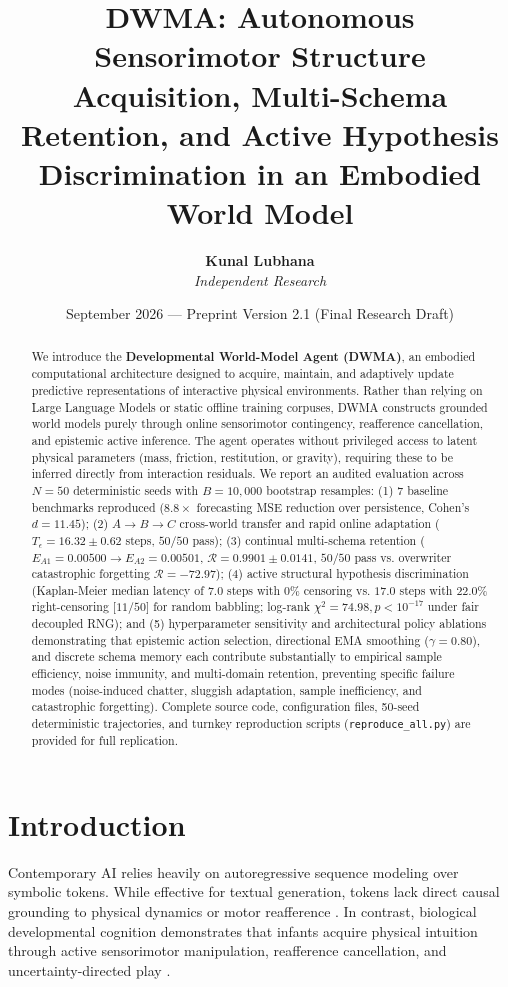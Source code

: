 \documentclass[10pt,twocolumn,a4paper]{article}
\title{\textbf{DWMA: Autonomous Sensorimotor Structure Acquisition, Multi-Schema Retention, and Active Hypothesis Discrimination in an Embodied World Model}}
\author{
  \textbf{Kunal Lubhana} \\
  \textit{Independent Research}
}
\date{September 2026 --- Preprint Version 2.1 (Final Research Draft)}
\begin{document}
\maketitle

\begin{abstract}
We introduce the \textbf{Developmental World-Model Agent (DWMA)}, an embodied computational architecture designed to acquire, maintain, and adaptively update predictive representations of interactive physical environments. Rather than relying on Large Language Models or static offline training corpuses, DWMA constructs grounded world models purely through online sensorimotor contingency, reafference cancellation, and epistemic active inference. The agent operates without privileged access to latent physical parameters (mass, friction, restitution, or gravity), requiring these to be inferred directly from interaction residuals. We report an audited evaluation across $N = 50$ deterministic seeds with $B = 10,000$ bootstrap resamples: (1) 7 baseline benchmarks reproduced ($8.8\times$ forecasting MSE reduction over persistence, Cohen's $d = 11.45$); (2) $A \to B \to C$ cross-world transfer and rapid online adaptation ($T_\epsilon = 16.32 \pm 0.62$ steps, $50/50$ pass); (3) continual multi-schema retention ($E_{A1} = 0.00500 \to E_{A2} = 0.00501$, $\mathcal{R} = 0.9901 \pm 0.0141$, $50/50$ pass vs. overwriter catastrophic forgetting $\mathcal{R} = -72.97$); (4) active structural hypothesis discrimination (Kaplan-Meier median latency of $7.0$ steps with $0\%$ censoring vs. $17.0$ steps with $22.0\%$ right-censoring [$11/50$] for random babbling; log-rank $\chi^2 = 74.98, p < 10^{-17}$ under fair decoupled RNG); and (5) hyperparameter sensitivity and architectural policy ablations demonstrating that epistemic action selection, directional EMA smoothing ($\gamma = 0.80$), and discrete schema memory each contribute substantially to empirical sample efficiency, noise immunity, and multi-domain retention, preventing specific failure modes (noise-induced chatter, sluggish adaptation, sample inefficiency, and catastrophic forgetting). Complete source code, configuration files, 50-seed deterministic trajectories, and turnkey reproduction scripts (\texttt{reproduce\_all.py}) are provided for full replication.
\end{abstract}

\section{Introduction}
Contemporary AI relies heavily on autoregressive sequence modeling over symbolic tokens. While effective for textual generation, tokens lack direct causal grounding to physical dynamics or motor reafference \cite{harnad1990,brooks1991,bender2020}. In contrast, biological developmental cognition demonstrates that infants acquire physical intuition through active sensorimotor manipulation, reafference cancellation, and uncertainty-directed play \cite{piaget1952,vonholst1950,friston2010,gopnik2012}. 
\end{document}
